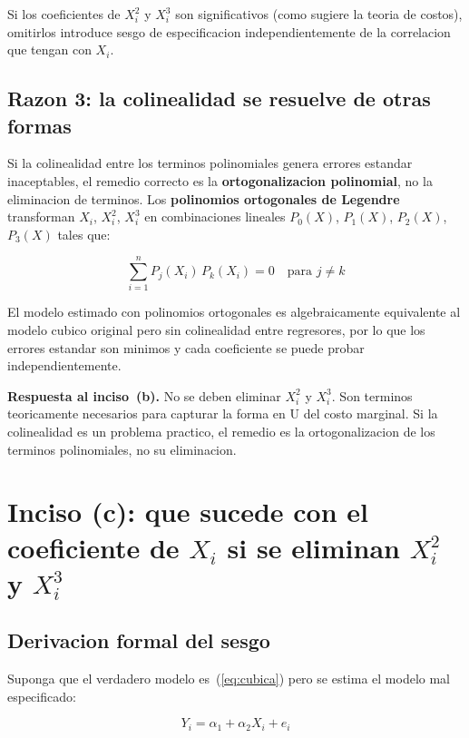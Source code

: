 \documentclass[12pt, letterpaper]{article}
\theoremstyle{remark}
\begin{document}
Si los coeficientes de $X_i^2$ y $X_i^3$ son significativos (como sugiere
la teoria de costos), omitirlos introduce sesgo de especificacion independientemente
de la correlacion que tengan con $X_i$.

\subsection{Razon 3: la colinealidad se resuelve de otras formas}

Si la colinealidad entre los terminos polinomiales genera errores estandar
inaceptables, el remedio correcto es la \textbf{ortogonalizacion polinomial},
no la eliminacion de terminos. Los \textbf{polinomios ortogonales de Legendre}
transforman $X_i$, $X_i^2$, $X_i^3$ en combinaciones lineales $P_0(X)$,
$P_1(X)$, $P_2(X)$, $P_3(X)$ tales que:

\begin{equation}
  \sum_{i=1}^n P_j(X_i)\, P_k(X_i) = 0 \quad \text{para } j \neq k
  \label{eq:ortogonal}
\end{equation}

El modelo estimado con polinomios ortogonales es algebraicamente equivalente
al modelo cubico original pero sin colinealidad entre regresores, por lo que
los errores estandar son minimos y cada coeficiente se puede probar
independientemente.

\begin{clave}
  \textbf{Respuesta al inciso~(b).} No se deben eliminar $X_i^2$ y $X_i^3$.
  Son terminos teoricamente necesarios para capturar la forma en U del costo
  marginal. Si la colinealidad es un problema practico, el remedio es
  la ortogonalizacion de los terminos polinomiales, no su eliminacion.
\end{clave}

\section{Inciso (c): que sucede con el coeficiente de \texorpdfstring{$X_i$}{Xi} si se eliminan \texorpdfstring{$X_i^2$}{Xi2} y \texorpdfstring{$X_i^3$}{Xi3}}

\subsection{Derivacion formal del sesgo}

Suponga que el verdadero modelo es~(\ref{eq:cubica}) pero se estima el modelo
mal especificado:

\begin{equation}
  Y_i = \alpha_1 + \alpha_2 X_i + e_i
  \label{eq:lineal}
\end{equation}
\end{document}
